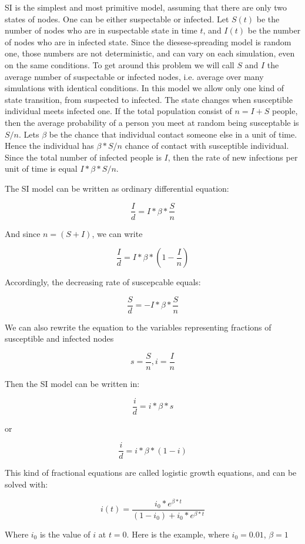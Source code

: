 \documentclass[nostrict]{szablonPG}
\begin{document}
SI is the simplest and most primitive model, assuming that there are only two states of nodes. One can be either suspectable or infected. Let $S(t)$ be the number of nodes who are in suspectable state in time $t$, and $I(t)$ be the number of nodes who are in infected state. Since the diesese-spreading model is random one, those numbers are not deterministic, and can vary on each simulation, even on the same conditions. To get around this problem we will call $S$ and $I$ the average number of suspectable or infected nodes, i.e. average over many simulations with identical conditions.
In this model we allow only one kind of state transition, from suspected to infected. The state changes when susceptible individual meets infected one. If the total population consist of $n = I + S$ people, then the average probability of a person you meet at random being susceptable is $S/n$.
Lets $\beta$ be the chance that individual contact someone else in a unit of time. 
Hence the individual has $\beta*S/n$ chance of contact with susceptible individual.
Since the total number of infected people is $I$, then the rate of new infections per unit of time is equal $I * \beta*S/n$.

The SI model can be written as ordinary differential equation:

\[\frac{I}{d} = I * \beta * \frac{S}{n}\]

And since $n = (S + I)$, we can write 

\[\frac{I}{d} = I * \beta * (1 - \frac{I}{n})\]

Accordingly, the decreasing rate of suscepcable equals:

\[\frac{S}{d} = - I * \beta * \frac{S}{n}\]

We can also rewrite the equation to the variables representing fractions of susceptible and infected nodes

\[s = \frac{S}{n}, i = \frac{I}{n}\]

Then the SI model can be written in:

\[\frac{i}{d} = i*\beta*s\]

or 

\[\frac{i}{d} = i * \beta * (1-i)\]

This kind of fractional equations are called logistic growth equations, and can be solved with:

\[i(t) =\frac{ i_0 * e^{\beta*t} }{(1 - i_0) + i_0 * e^{\beta*t}}\]

Where $i_0$ is the value of $i$ at $t = 0$. Here is the example, where $i_0 = 0.01$, $\beta = 1$
\end{document}
